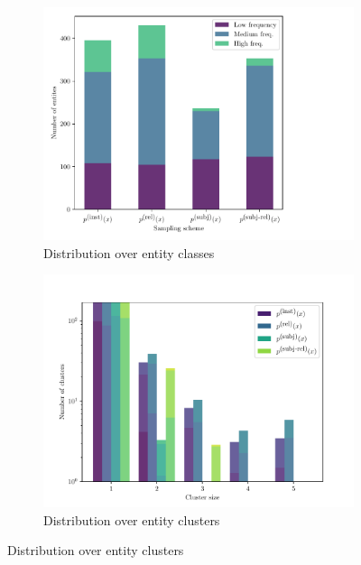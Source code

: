  \begin{figure}
   \centering
   \begin{subfigure}{0.7\textwidth}
     \includegraphics[width=\textwidth]{figures/analysis/selective_supervised_entity}
     \caption{\label{fig:kbpo:selective-supervised-entity} Distribution over entity classes}
   \end{subfigure}
 
   \begin{subfigure}{0.7\textwidth}
     \includegraphics[width=\textwidth]{figures/analysis/selective_supervised_clusters}
     \caption{\label{fig:kbpo:selective-supervised-clusters} Distribution over entity clusters}
   \end{subfigure}
 

\end{figure}
